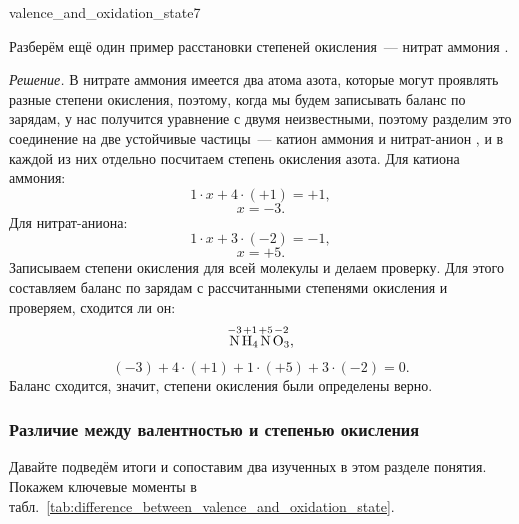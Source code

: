 \begin{example}{}{valence_and_oxidation_state7}
    \begin{condition}
        Разберём ещё один пример расстановки степеней окисления~--- нитрат аммония .
    \end{condition}

    \medskip

    \textit{Решение.} В нитрате аммония имеется два атома азота, которые могут проявлять разные степени окисления, поэтому, когда мы будем записывать баланс по зарядам, у нас получится уравнение с двумя неизвестными, поэтому разделим это соединение на две устойчивые частицы~--- катион аммония  и нитрат-анион , и в каждой из них отдельно посчитаем степень окисления азота. Для катиона аммония:
    \begin{equation*}
        1 \cdot x + 4 \cdot (+1) = +1,
    \end{equation*}
    \begin{equation*}
        x = -3.
    \end{equation*}
    Для нитрат-аниона:
    \begin{equation*}
        1 \cdot x + 3 \cdot (-2) = -1,
    \end{equation*}
    \begin{equation*}
        x = +5.
    \end{equation*}
    Записываем степени окисления для всей молекулы и делаем проверку. Для этого составляем баланс по зарядам с рассчитанными степенями окисления и проверяем, сходится ли он:
    \begin{equation*}
        \overset{-3}{\ce{N}}\overset{+1}{\ce{H4}}\overset{+5}{\ce{N}}\overset{-2}{\ce{O3}},
    \end{equation*}
    \begin{equation*}
        (-3) + 4 \cdot (+1) + 1 \cdot (+5) + 3 \cdot (-2) = 0.
    \end{equation*}
    Баланс сходится, значит, степени окисления были определены верно.
\end{example}

\subsubsection*{Различие между валентностью и степенью окисления}

Давайте подведём итоги и сопоставим два изученных в этом разделе понятия. Покажем ключевые моменты в табл.~\ref{tab:difference_between_valence_and_oxidation_state}.

